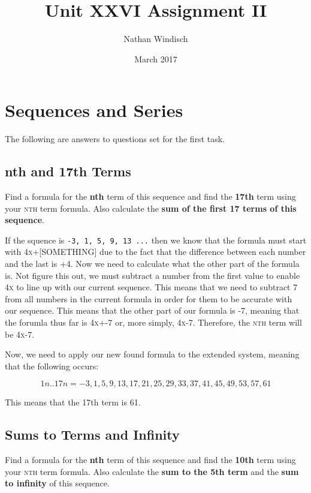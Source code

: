 \documentclass[a4paper,12pt]{article}
\begin{document}
\title{Unit XXVI Assignment II}
\author{Nathan Windisch}
\date{March 2017}
\maketitle
{}
\tableofcontents
\newpage

\section{Sequences and Series}
The following are answers to questions set for the first task.
\subsection{nth and 17th Terms}
Find a formula for the \textbf{nth} term of this sequence and find the \textbf{17th} term using your \textsc{nth} term formula. Also calculate the \textbf{sum of the first 17 terms of this sequence}.

If the squence is \texttt{-3, 1, 5, 9, 13 ...} then we know that the formula must start with \textsc{4x+[SOMETHING]} due to the fact that the difference between each number and the last is +4. Now we need to calculate what the other part of the formula is. Not figure this out, we must subtract a number from the first value to enable \textsc{4x} to line up with our current sequence. This means that we need to subtract \textsc{7} from all numbers in the current formula in order for them to be accurate with our sequence. This means that the other part of our formula is \textsc{-7}, meaning that the forumla thus far is \textsc{4x+-7} or, more simply, \textsc{4x-7}. Therefore, the \textsc{nth} term will be \textsc{4x-7}.

Now, we need to apply our new found formula to the extended system, meaning that the following occurs:

\[
  {1n..17n = -3, 1, 5, 9, 13, 17, 21, 25, 29, 33, 37, 41, 45, 49, 53, 57, 61}
\]

This means that the 17th term is \textsc{61}.

\newpage

\subsection{Sums to Terms and Infinity}
Find a formula for the \textbf{nth} term of this sequence and find the \textbf{10th} term using your \textsc{nth} term formula. Also calculate the \textbf{sum to the 5th term} and the \textbf{sum to infinity} of this sequence.
\end{document}
